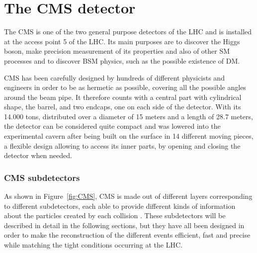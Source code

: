 \documentclass[a4paper, 10pt, openright]{report}
\begin{document}
\section{The \ac{CMS} detector} \label{section:CMS}

The \acf{CMS} is one of the two general purpose detectors of the \ac{LHC} and is installed at the access point 5 of the \ac{LHC}. Its main purposes are to discover the Higgs boson, make precision measurement of its properties and also of other \ac{SM} processes and to discover \ac{BSM} physics, such as the possible existence of \ac{DM}. 

\ac{CMS} has been carefully designed by hundreds of different physicists and engineers in order to be as hermetic as possible, covering all the possible angles around the beam pipe. It therefore counts with a central part with cylindrical shape, the barrel, and two endcaps, one on each side of the detector. With its 14.000 tons, distributed over a diameter of 15 meters and a length of 28.7 meters, the detector can be considered quite compact and was lowered into the experimental cavern after being built on the surface in 14 different moving pieces, a flexible design allowing to access its inner parts, by opening and closing the detector when needed.

\subsubsection*{\acs{CMS} subdetectors}

As shown in Figure~\ref{fig:CMS}, \ac{CMS} is made out of different layers corresponding to different subdetectors, each able to provide different kinds of information about the particles created by each collision \cite{CMSDescription}. These subdetectors will be described in detail in the following sections, but they have all been designed in order to make the reconstruction of the different events efficient, fast and precise while matching the tight conditions occurring at the \ac{LHC}.
\end{document}

